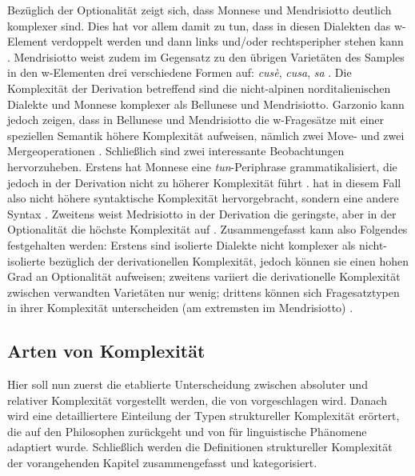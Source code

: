 Bezüglich der Optionalität zeigt sich, dass Monnese und Mendrisiotto deutlich komplexer sind. Dies hat vor allem damit zu tun, dass in diesen Dialekten das w-Element verdoppelt werden und dann links und/oder rechtsperipher stehen kann \citep[105, 108-111]{Garzonio2016}. Mendrisiotto weist zudem im Gegensatz zu den übrigen Varietäten des Samples in den w-Elementen drei verschiedene Formen auf: \textit{cusè}, \textit{cusa}, \textit{sa} \citep[109]{Garzonio2016}. Die Komplexität der Derivation betreffend sind die nicht-alpinen norditalienischen Dialekte und Monnese komplexer als Bellunese und Mendrisiotto. Garzonio kann jedoch zeigen, dass in Bellunese und Mendrisiotto die w-Fragesätze mit einer speziellen Semantik höhere Komplexität aufweisen, nämlich zwei Move- und zwei Mergeoperationen \citep[108, 111]{Garzonio2016}. Schließlich sind zwei interessante Beobachtungen hervorzuheben. Erstens hat Monnese eine \textit{tun}-Periphrase grammatikalisiert, die jedoch in der Derivation nicht zu höherer Komplexität führt \citep[103--104]{Garzonio2016}.  hat in diesem Fall also nicht höhere syntaktische Komplexität hervorgebracht, sondern eine andere Syntax \citep[113]{Garzonio2016}. Zweitens weist Medrisiotto in der Derivation die geringste, aber in der Optionalität die höchste Komplexität auf \citep[111--114]{Garzonio2016}. Zusammengefasst kann also Folgendes festgehalten werden: Erstens sind isolierte Dialekte nicht komplexer als nicht-isolierte bezüglich der derivationellen Komplexität, jedoch können sie einen hohen Grad an Optionalität aufweisen; zweitens variiert die derivationelle Komplexität zwischen verwandten Varietäten nur wenig; drittens können sich Fragesatztypen in ihrer Komplexität unterscheiden (am extremsten im Mendrisiotto) \citep[114]{Garzonio2016}.

\subsection{Arten von Komplexität}\label{2.2.5}

Hier soll nun zuerst die etablierte Unterscheidung zwischen absoluter und relativer Komplexität vorgestellt werden, die von \citet{Miestamo2008} vorgeschlagen wird. Danach wird eine detailliertere Einteilung der Typen struktureller Komplexität erörtert, die auf den Philosophen \citet{Rescher1998} zurückgeht und von \citet{MiestamoSinnemäkiKarlsson2008} für linguistische Phänomene adaptiert wurde. Schließlich werden die Definitionen struktureller Komplexität der vorangehenden Kapitel zusammengefasst und kategorisiert.

